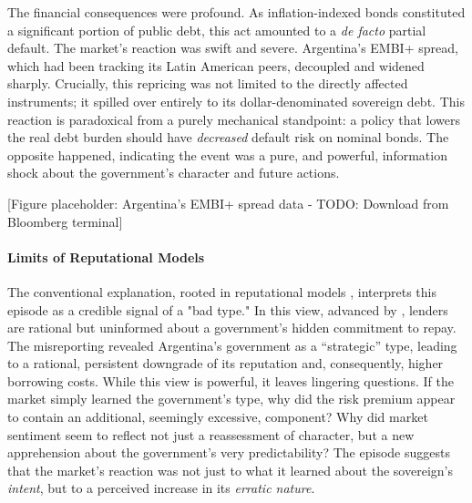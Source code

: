 \documentclass[12pt]{article}
\theoremstyle{plain}
\begin{document}
The financial consequences were profound. As inflation-indexed bonds
constituted a significant portion of public debt, this act amounted to a
\textit{de facto} partial default. The market's reaction was swift and severe.
Argentina's EMBI+ spread, which had been tracking its Latin American peers,
decoupled and widened sharply. Crucially, this repricing was not limited to the
directly affected instruments; it spilled over entirely to its
dollar-denominated sovereign debt. This reaction is paradoxical from a purely
mechanical standpoint: a policy that lowers the real debt burden should have
\textit{decreased} default risk on nominal bonds. The opposite happened,
indicating the event was a pure, and powerful, information shock about the
government's character and future actions.


	[Figure placeholder: Argentina's EMBI+ spread data - TODO: Download from Bloomberg terminal]

\paragraph{Limits of Reputational Models}
The conventional explanation, rooted in reputational models
\citep{ColeDowEnglish1995}, interprets this episode as a credible signal of a
"bad type." In this view, advanced by \citep{MorelliMoretti2023}, lenders are
rational but uninformed about a government's hidden commitment to repay. The
misreporting revealed Argentina's government as a ``strategic'' type, leading
to a rational, persistent downgrade of its reputation and, consequently, higher
borrowing costs. While this view is powerful, it leaves lingering questions. If
the market simply learned the government's type, why did the risk premium
appear to contain an additional, seemingly excessive, component? Why did market
sentiment seem to reflect not just a reassessment of character, but a new
apprehension about the government's very predictability? The episode suggests
that the market's reaction was not just to what it learned about the
sovereign's \textit{intent}, but to a perceived increase in its \textit{erratic
	nature}.
\end{document}
